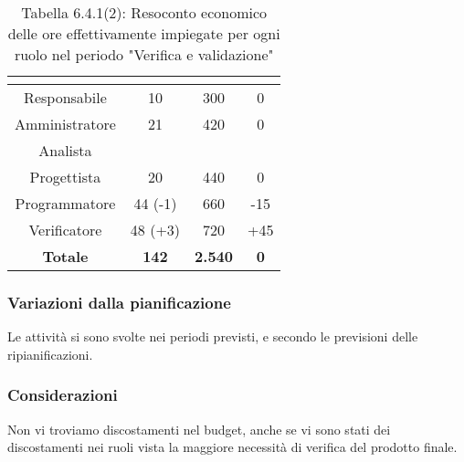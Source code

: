 \renewcommand{\arraystretch}{1.4}
\begin{table}[H]
\begin{center}
\begin{tabular}{|c|c|c|c|}
\hline
\rowcolor{title_row}
\textbf{\color{title_text}{Ruolo}}  & \textbf{\color{title_text}{Ore}} & \textbf{\color{title_text}{Costo in \euro}} & \textbf{\color{title_text}{Differenza al preventivo in \euro}} \\ \hline
Responsabile    & 10 & 300 & 0 \\ \hline
Amministratore  & 21 & 420 & 0\\ \hline
Analista        & & & \\ \hline
Progettista     & 20 & 440 & 0\\ \hline
Programmatore   & 44 (-1) & 660 & -15\\ \hline
Verificatore    & 48 (+3) & 720 & +45\\ \hline
\textbf{Totale} & \textbf{142}    & \textbf{2.540} & \textbf{0} \\ \hline
\end{tabular}
\caption{Tabella 6.4.1(2): Resoconto economico delle ore effettivamente impiegate per ogni ruolo nel periodo "Verifica e validazione"\label{}}
\end{center}
\end{table}
\renewcommand{\arraystretch}{1}


\subsubsection{Variazioni dalla pianificazione}
Le attività si sono svolte nei periodi previsti, e secondo le previsioni delle ripianificazioni.

\subsubsection{Considerazioni}
Non vi troviamo discostamenti nel budget, anche se vi sono stati dei discostamenti nei ruoli vista la maggiore necessità di verifica del prodotto finale.
\pagebreak
